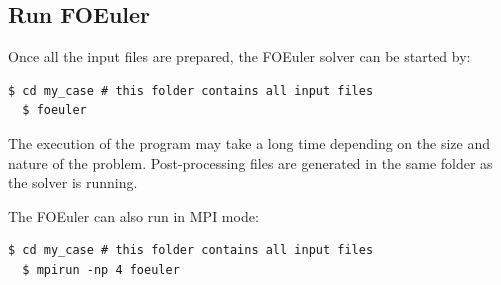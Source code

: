 \documentclass[]{article}
\begin{document}
\subsection{Run FOEuler}

Once all the input files are prepared, the FOEuler solver can be started by:
\begin{lstlisting}[backgroundcolor=\color{lightgray}]
  $ cd my_case # this folder contains all input files
  $ foeuler
\end{lstlisting}
The execution of the program may take a long time depending on the size and nature of the problem.
Post-processing files are generated in the same folder as the solver is running.

The FOEuler can also run in MPI mode:
\begin{lstlisting}[backgroundcolor=\color{lightgray}]
  $ cd my_case # this folder contains all input files
  $ mpirun -np 4 foeuler
\end{lstlisting}
\end{document}
